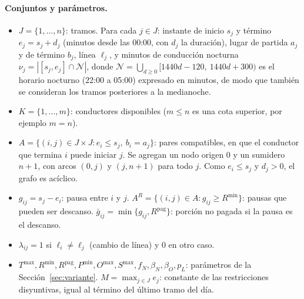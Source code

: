 \documentclass[letter, 10pt]{article}
\begin{document}
\paragraph{Conjuntos y parámetros.}
\begin{itemize}
\item $J=\{1,\dots,n\}$: tramos. Para cada $j\in J$: instante de inicio $s_j$ y término $e_j=s_j+d_j$ (minutos desde las 00:00, con $d_j$ la duración), lugar de partida $a_j$ y de término $b_j$, línea $\ell_j$, y minutos de conducción nocturna $\nu_j=|[s_j,e_j]\cap\mathcal{N}|$, donde $\mathcal{N}=\bigcup_{d\geq 0}[1440d-120,\ 1440d+300)$ es el horario nocturno (22:00 a 05:00) expresado en minutos, de modo que también se consideran los tramos posteriores a la medianoche.
\item $K=\{1,\dots,m\}$: conductores disponibles ($m\leq n$ es una cota superior, por ejemplo $m=n$).
\item $A=\{(i,j)\in J\times J : e_i\leq s_j,\ b_i=a_j\}$: pares compatibles, en que el conductor que termina $i$ puede iniciar $j$. Se agregan un nodo origen $0$ y un sumidero $n{+}1$, con arcos $(0,j)$ y $(j,n{+}1)$ para todo $j$. Como $e_i\leq s_j$ y $d_j>0$, el grafo es acíclico.
\item $g_{ij}=s_j-e_i$: pausa entre $i$ y $j$. $A^R=\{(i,j)\in A: g_{ij}\geq R^{\min}\}$: pausas que pueden ser descanso. $\bar g_{ij}=\min\{g_{ij},R^{\text{pag}}\}$: porción no pagada si la pausa es el descanso.
\item $\lambda_{ij}=1$ si $\ell_i\neq\ell_j$ (cambio de línea) y 0 en otro caso.
\item $T^{\max}, R^{\min}, R^{\text{pag}}, P^{\min}, O^{\max}, S^{\max}, f_N, \beta_N, \beta_O, p_L$: parámetros de la Sección~\ref{sec:variante}. $M=\max_{j\in J} e_j$: constante de las restricciones disyuntivas, igual al término del último tramo del día.
\end{itemize}
\end{document}
